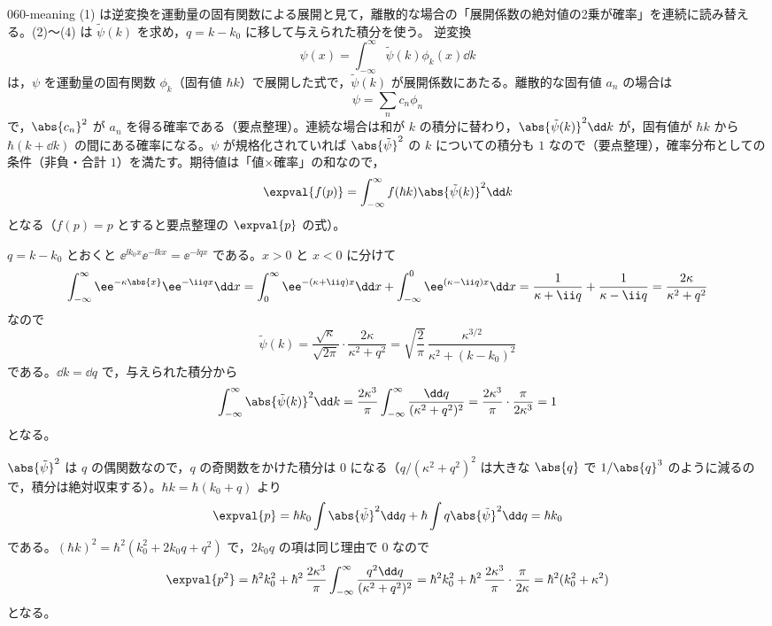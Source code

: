 \documentclass[uplatex,dvipdfmx,a4paper,11pt]{jsarticle}
\begin{document}
\kaitouhen
{}
\begin{kaisetsu}{060-meaning}
\houshin (1) は逆変換を運動量の固有関数による展開と見て，離散的な場合の「展開係数の絶対値の2乗が確率」を連続に読み替える。(2)〜(4) は $\tilde{\psi}(k)$ を求め，$q=k-k_{0}$ に移して与えられた積分を使う。
\keisan {} 逆変換
\[ \psi(x)=\int_{-\infty}^{\infty}\tilde{\psi}(k)\phi_{k}(x)\dd k \]
は，$\psi$ を運動量の固有関数 $\phi_{k}$（固有値 $\hbar k$）で展開した式で，$\tilde{\psi}(k)$ が展開係数にあたる。離散的な固有値 $a_{n}$ の場合は
\[ \psi=\sum_{n}c_{n}\phi_{n} \]
で，$\abs{c_{n}}^{2}$ が $a_{n}$ を得る確率である（要点整理）。連続な場合は和が $k$ の積分に替わり，$\abs{\tilde{\psi}(k)}^{2}\dd k$ が，固有値が $\hbar k$ から $\hbar(k+\dd k)$ の間にある確率になる。$\psi$ が規格化されていれば $\abs{\tilde{\psi}}^{2}$ の $k$ についての積分も $1$ なので（要点整理），確率分布としての条件（非負・合計 $1$）を満たす。期待値は「値×確率」の和なので，
\[ \expval{f(p)}=\int_{-\infty}^{\infty}f(\hbar k)\abs{\tilde{\psi}(k)}^{2}\dd k \]
となる（$f(p)=p$ とすると要点整理の $\expval{p}$ の式）。

 $q=k-k_{0}$ とおくと $\ee^{\ii k_{0}x}\ee^{-\ii kx}=\ee^{-\ii qx}$ である。$x>0$ と $x<0$ に分けて
\[ \int_{-\infty}^{\infty}\ee^{-\kappa\abs{x}}\ee^{-\ii qx}\dd x=\int_{0}^{\infty}\ee^{-(\kappa+\ii q)x}\dd x+\int_{-\infty}^{0}\ee^{(\kappa-\ii q)x}\dd x=\frac{1}{\kappa+\ii q}+\frac{1}{\kappa-\ii q}=\frac{2\kappa}{\kappa^{2}+q^{2}} \]
なので
\[ \tilde{\psi}(k)=\frac{\sqrt{\kappa}}{\sqrt{2\pi}}\cdot\frac{2\kappa}{\kappa^{2}+q^{2}}=\sqrt{\frac{2}{\pi}}\,\frac{\kappa^{3/2}}{\kappa^{2}+(k-k_{0})^{2}} \]
である。$\dd k=\dd q$ で，与えられた積分から
\[ \int_{-\infty}^{\infty}\abs{\tilde{\psi}(k)}^{2}\dd k=\frac{2\kappa^{3}}{\pi}\int_{-\infty}^{\infty}\frac{\dd q}{(\kappa^{2}+q^{2})^{2}}=\frac{2\kappa^{3}}{\pi}\cdot\frac{\pi}{2\kappa^{3}}=1 \]
となる。

 $\abs{\tilde{\psi}}^{2}$ は $q$ の偶関数なので，$q$ の奇関数をかけた積分は $0$ になる（$q/(\kappa^{2}+q^{2})^{2}$ は大きな $\abs{q}$ で $1/\abs{q}^{3}$ のように減るので，積分は絶対収束する）。$\hbar k=\hbar(k_{0}+q)$ より
\[ \expval{p}=\hbar k_{0}\int\abs{\tilde{\psi}}^{2}\dd q+\hbar\int q\abs{\tilde{\psi}}^{2}\dd q=\hbar k_{0} \]
である。$(\hbar k)^{2}=\hbar^{2}(k_{0}^{2}+2k_{0}q+q^{2})$ で，$2k_{0}q$ の項は同じ理由で $0$ なので
\[ \expval{p^{2}}=\hbar^{2}k_{0}^{2}+\hbar^{2}\,\frac{2\kappa^{3}}{\pi}\int_{-\infty}^{\infty}\frac{q^{2}\dd q}{(\kappa^{2}+q^{2})^{2}}=\hbar^{2}k_{0}^{2}+\hbar^{2}\,\frac{2\kappa^{3}}{\pi}\cdot\frac{\pi}{2\kappa}=\hbar^{2}(k_{0}^{2}+\kappa^{2}) \]
となる。


\end{kaisetsu}
\end{document}
